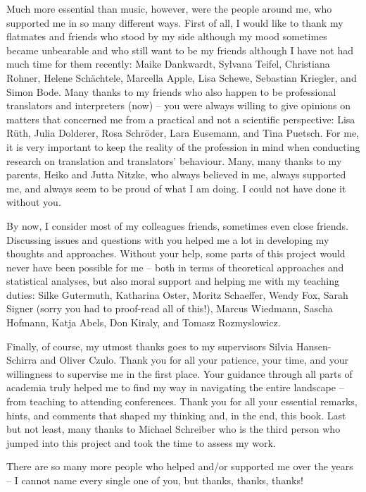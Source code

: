Much more essential than music, however, were the people around me, who supported me in so many different ways. First of all, I would like to thank my flatmates and friends who stood by my side although my mood sometimes became unbearable and who still want to be my friends although I have not had much time for them recently: Maike Dankwardt, Sylvana Teifel, Christiana Rohner, Helene Schächtele, Marcella Apple, Lisa Schewe, Sebastian Kriegler, and Simon Bode. Many thanks to my friends who also happen to be professional translators and interpreters (now) – you were always willing to give opinions on matters that concerned me from a practical and not a scientific perspective: Lisa Rüth, Julia Dolderer, Rosa Schröder, Lara Eusemann, and Tina Puetsch. For me, it is very important to keep the reality of the profession in mind when conducting research on translation and translators' behaviour. Many, many thanks to my parents, Heiko and Jutta Nitzke, who always believed in me, always supported me, and always seem to be proud of what I am doing. I could not have done it without you.

By now, I consider most of my colleagues friends, sometimes even close friends. Discussing issues and questions with you helped me a lot in developing my thoughts and approaches. Without your help, some parts of this project would never have been possible for me – both in terms of theoretical approaches and statistical analyses, but also moral support and helping me with my teaching duties: Silke Gutermuth, Katharina Oster, Moritz Schaeffer, Wendy Fox, Sarah Signer (sorry you had to proof-read all of this!), Marcus Wiedmann, Sascha Hofmann, Katja Abels, Don Kiraly, and Tomasz Rozmyslowicz.

Finally, of course, my utmost thanks goes to my supervisors Silvia Hansen-Schirra and Oliver Czulo. Thank you for all your patience, your time, and your willingness to supervise me in the first place. Your guidance through all parts of academia truly helped me to find my way in navigating the entire landscape – from teaching to attending conferences. Thank you for all your essential remarks, hints, and comments that shaped my thinking and, in the end, this book. Last but not least, many thanks to Michael Schreiber who is the third person who jumped into this project and took the time to assess my work.

There are so many more people who helped and\slash or supported me over the years – I cannot name every single one of you, but thanks, thanks, thanks!
